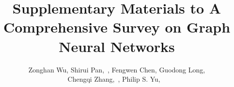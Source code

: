 \documentclass[journal,onecolumn]{IEEEtran}
\begin{document}
%
\title{Supplementary Materials to A Comprehensive Survey on Graph Neural Networks}
%
%

\author{Zonghan Wu, Shirui Pan,~,
Fengwen Chen,
Guodong Long,\\
Chengqi Zhang,~, %
Philip S. Yu, ~%



}
\end{document}
